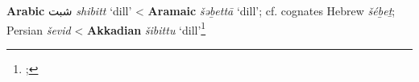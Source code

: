 \begin{etymology}\label{ety:shibitt}
\textbf{Arabic} {شبت} \textit{shibitt} `dill'
< \textbf{Aramaic} {} \textit{šəḇettā} `dill'; cf. cognates Hebrew  \textit{šéḇeṯ}; Persian  \textit{ševid} 
< \textbf{Akkadian} {} \textit{šibittu} `dill'\footnote{\textcite[1494-1495]{lane_arabic-english_1863}; }
\end{etymology}
